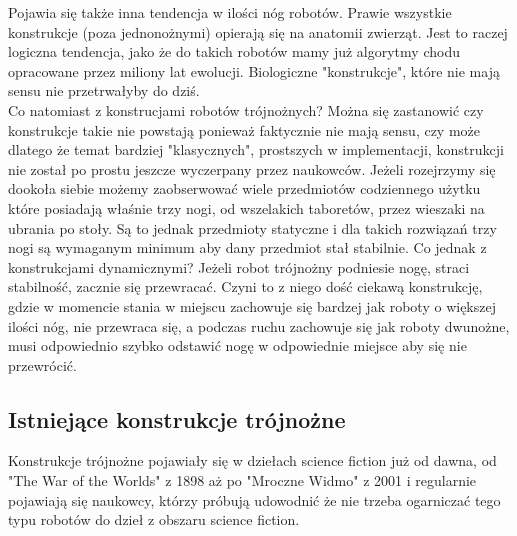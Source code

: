 \documentclass[a4paper,13pt]{article}
\begin{document}
Pojawia się także inna tendencja w ilości nóg robotów. Prawie wszystkie konstrukcje (poza jednonożnymi) opierają się na anatomii zwierząt. Jest to raczej logiczna tendencja, jako że do takich robotów mamy już algorytmy chodu opracowane przez miliony lat ewolucji. Biologiczne "konstrukcje", które nie mają sensu nie przetrwałyby do dziś. \cite{history}\\

Co natomiast z konstrucjami robotów trójnożnych? Można się zastanowić czy konstrukcje takie nie powstają ponieważ faktycznie nie mają sensu, czy może dlatego że temat bardziej "klasycznych", prostszych w implementacji, konstrukcji nie został po prostu jeszcze wyczerpany przez naukowców. Jeżeli rozejrzymy się dookoła siebie możemy zaobserwować wiele przedmiotów codziennego użytku które posiadają właśnie trzy nogi, od wszelakich taboretów, przez wieszaki na ubrania po stoły. Są to jednak przedmioty statyczne i dla takich rozwiązań trzy nogi są wymaganym minimum aby dany przedmiot stał stabilnie. Co jednak z konstrukcjami dynamicznymi? Jeżeli robot trójnożny podniesie nogę, straci stabilność, zacznie się przewracać. Czyni to z niego dość ciekawą konstrukcję, gdzie w momencie stania w miejscu zachowuje się bardzej jak roboty o większej ilości nóg, nie przewraca się, a podczas ruchu zachowuje się jak roboty dwunożne, musi odpowiednio szybko odstawić nogę w odpowiednie miejsce aby się nie przewrócić.\\

\subsection{Istniejące konstrukcje trójnożne}
Konstrukcje trójnożne pojawiały się w dziełach science fiction już od dawna, od "The War of the Worlds" z 1898 aż po "Mroczne Widmo" z 2001 i regularnie pojawiają się naukowcy, którzy próbują udowodnić że nie trzeba ogarniczać tego typu robotów do dzieł z obszaru science fiction.\\
\end{document}
